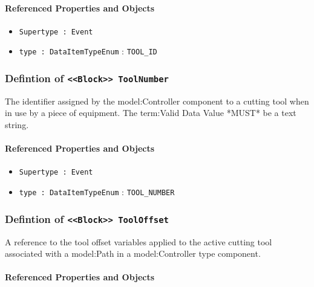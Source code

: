 \FloatBarrier
\paragraph{Referenced Properties and Objects}

\begin{itemize}
\item \texttt{Supertype : Event}

\item \texttt{type : DataItemTypeEnum} : \texttt{TOOL_ID}

\end{itemize}
\FloatBarrier
\subsubsection{Defintion of \texttt{<<Block>> ToolNumber}}
  \label{type:ToolNumber}

\FloatBarrier

The identifier assigned by the {model:Controller} component to a cutting tool when in use by a piece of equipment. 
 The {term:Valid Data Value} *MUST* be a text string.

\FloatBarrier
\paragraph{Referenced Properties and Objects}

\begin{itemize}
\item \texttt{Supertype : Event}

\item \texttt{type : DataItemTypeEnum} : \texttt{TOOL_NUMBER}

\end{itemize}
\FloatBarrier
\subsubsection{Defintion of \texttt{<<Block>> ToolOffset}}
  \label{type:ToolOffset}

\FloatBarrier

A reference to the tool offset variables applied to the active cutting tool associated with a {model:Path} in a {model:Controller} type component.

\FloatBarrier
\paragraph{Referenced Properties and Objects}

